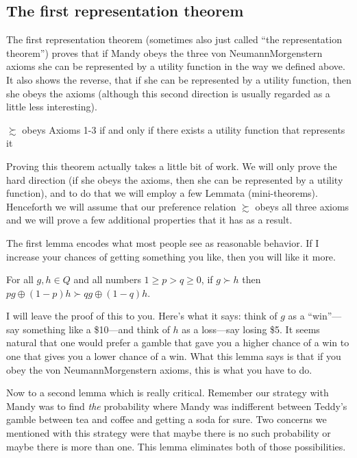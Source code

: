 \subsection{The first representation theorem}

The first representation theorem (sometimes also just called ``the representation theorem'') proves that if Mandy obeys the three von Neumann\breakslash Morgenstern axioms she can be represented by a utility function in the way we defined above.  It also shows the reverse, that if she can be represented by a utility function, then she obeys the axioms (although this second direction is usually regarded as a little less interesting).

\begin{proposition}
$\succsim$ obeys Axioms 1-3 if and only if there exists a utility function that represents it
\end{proposition}

Proving this theorem actually takes a little bit of work.  We will only prove the hard direction (if she obeys the axioms, then she can be represented by a utility function), and to do that we will employ a few Lemmata (mini-theorems). Henceforth we will assume that our preference relation $\succsim$ obeys all three axioms and we will prove a few additional properties that it has as a result.

The first lemma encodes what most people see as reasonable behavior. If I increase your chances of getting something you like, then you will like it more.
\begin{lemma}
\label{l:morebetter}
For all $g, h \in Q$ and all numbers $1 \geq p > q \geq 0$, if $g \succ h$ then $p g \oplus (1-p) h \succ q g \oplus (1-q) h $.
\end{lemma}
I will leave the proof of this to you. Here's what it says: think of $g$ as a ``win''---say something like a \$10---and think of $h$ as a loss---say losing \$5.  It seems natural that one would prefer a gamble that gave you a higher chance of a win to one that gives you a lower chance of a win.  What this lemma says is that if you obey the von Neumann\breakslash Morgenstern axioms, this is what you have to do.

Now to a second lemma which is really critical. Remember our strategy with Mandy was to find {\it the} probability where Mandy was indifferent between Teddy's gamble between tea and coffee and getting a soda for sure.  Two concerns we mentioned with this strategy were that maybe there is no such probability or maybe there is more than one. This lemma eliminates both of those possibilities.

